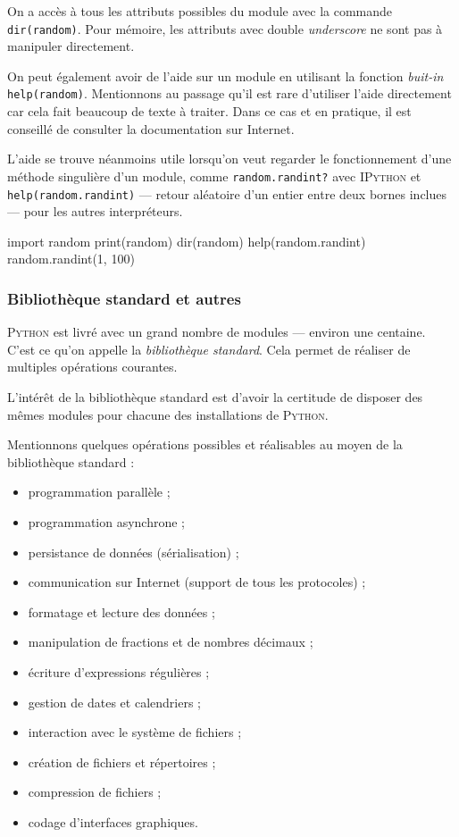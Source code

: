 On a accès à tous les attributs possibles du module avec la commande \texttt{dir(random)}. Pour mémoire, les attributs avec double \textit{underscore} ne sont pas à manipuler directement.

On peut également avoir de l'aide sur un module en utilisant la fonction \textit{buit-in} \texttt{help(random)}. Mentionnons au passage qu'il est rare d'utiliser l'aide directement car cela fait beaucoup de texte à traiter. Dans ce cas et en pratique, il est conseillé de consulter la documentation sur Internet. 

L'aide se trouve néanmoins utile lorsqu'on veut regarder le fonctionnement d'une méthode singulière d'un module, comme \texttt{random.randint?} avec \textsc{IPython} et \texttt{help(random.randint)} --- retour aléatoire d'un entier entre deux bornes inclues --- pour les autres interpréteurs.


\begin{idleconsole*}
\begin{pyconsole}[][breaklines]
import random
print(random)
dir(random)
help(random.randint)
random.randint(1, 100)
\end{pyconsole}
\end{idleconsole*}

\subsubsection[Bibliothèque standard et autres]{Bibliothèque standard et autres}
\label{subsub:XI.4.2.2}

\textsc{Python} est livré avec un grand nombre de modules --- environ une centaine. C'est ce qu'on appelle la \emph{bibliothèque standard}. Cela permet de réaliser de multiples opérations courantes. 

L'intérêt de la bibliothèque standard est d'avoir la certitude de disposer des mêmes modules pour chacune des installations de \textsc{Python}. 

Mentionnons quelques opérations possibles et réalisables au moyen de la bibliothèque standard :
\begin{itemize}\jazzitem
\item programmation parallèle ;
\item programmation asynchrone ;
\item persistance de données (sérialisation) ;
\item communication sur Internet (support de tous les protocoles) ;
\item formatage et lecture des données ;
\item manipulation de fractions et de nombres décimaux ;
\item écriture d'expressions régulières ;
\item gestion de dates et calendriers ;
\item interaction avec le système de fichiers ;
\item création de fichiers et répertoires ;
\item compression de fichiers ;
\item codage d'interfaces graphiques.
\end{itemize}

